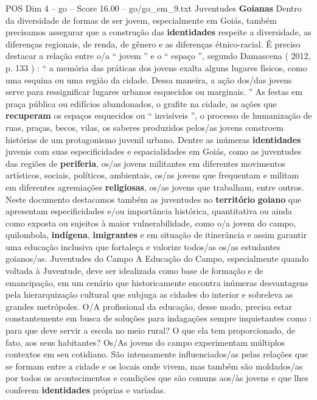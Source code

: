 \begin{textsample}{POS Dim 4 – go – Score 16.00 – go/go\_em\_9.txt}  \label{ex:f4_pos_063}
Juventudes \textbf{Goianas} Dentro da diversidade de formas de ser jovem, especialmente em Goiás, também precisamos assegurar que a construção das \textbf{identidades} respeite a diversidade, as diferenças regionais, de renda, de gênero e as diferenças étnico-racial.
É preciso destacar a relação entre o/a “ jovem ” e o “ espaço ”, segundo Damascena ( 2012, p. 133 ) : “ a memória das práticas dos jovens exalta alguns lugares físicos, como uma esquina ou uma região da cidade.
Dessa maneira, a ação dos/das jovens serve para ressignificar lugares urbanos esquecidos ou marginais. ” As festas em praça pública ou edifícios abandonados, o grafite na cidade, as ações que \textbf{recuperam} os espaços esquecidos ou “ invisíveis ”, o processo de humanização de ruas, praças, becos, vilas, os saberes produzidos pelos/as jovens constroem histórias de um protagonismo juvenil urbano.
Dentre as inúmeras \textbf{identidades} juvenis com suas especificidades e espacialidades em Goiás, como as juventudes das regiões de \textbf{periferia}, os/as jovens militantes em diferentes movimentos artísticos, sociais, políticos, ambientais, os/as jovens que frequentam e militam em diferentes agremiações \textbf{religiosas}, os/as jovens que trabalham, entre outros.
Neste documento destacamos também as juventudes no \textbf{território} \textbf{goiano} que apresentam especificidades e/ou importância histórica, quantitativa ou ainda como exposta ou sujeitos à maior vulnerabilidade, como o/a jovem do campo, quilombola, \textbf{indígena}, \textbf{imigrantes} e em situação de itinerância e assim garantir uma educação inclusiva que fortaleça e valorize todos/as os/as estudantes goianos/as.
Juventudes do Campo A Educação do Campo, especialmente quando voltada à Juventude, deve ser idealizada como base de formação e de emancipação, em um cenário que historicamente encontra inúmeras desvantagens pela hierarquização cultural que subjuga as cidades do interior e sobreleva as grandes metrópoles.
O/A profissional da educação, desse modo, precisa estar constantemente em busca de soluções para indagações sempre inquietantes como : para que deve servir a escola no meio rural?
O que ela tem proporcionado, de fato, aos seus habitantes?
Os/As jovens do campo experimentam múltiplos contextos em seu cotidiano.
São intensamente influenciados/as pelas relações que se formam entre a cidade e os locais onde vivem, mas também são moldados/as por todos os acontecimentos e condições que são comuns aos/às jovens e que lhes conferem \textbf{identidades} próprias e variadas.

\end{textsample}
